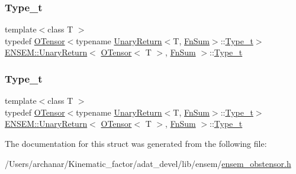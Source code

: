 \subsubsection{\texorpdfstring{Type\_t}{Type\_t}\hspace{0.1cm}{\footnotesize\ttfamily [1/2]}}
{\footnotesize\ttfamily template$<$class T $>$ \\
typedef \mbox{\hyperlink{classENSEM_1_1OTensor}{O\+Tensor}}$<$typename \mbox{\hyperlink{structENSEM_1_1UnaryReturn}{Unary\+Return}}$<$T, \mbox{\hyperlink{structENSEM_1_1FnSum}{Fn\+Sum}}$>$\+::\mbox{\hyperlink{structENSEM_1_1UnaryReturn_3_01OTensor_3_01T_01_4_00_01FnSum_01_4_a97a77020ae2f9a17419c0a6b9c45b5b9}{Type\+\_\+t}}$>$ \mbox{\hyperlink{structENSEM_1_1UnaryReturn}{E\+N\+S\+E\+M\+::\+Unary\+Return}}$<$ \mbox{\hyperlink{classENSEM_1_1OTensor}{O\+Tensor}}$<$ T $>$, \mbox{\hyperlink{structENSEM_1_1FnSum}{Fn\+Sum}} $>$\+::\mbox{\hyperlink{structENSEM_1_1UnaryReturn_3_01OTensor_3_01T_01_4_00_01FnSum_01_4_a97a77020ae2f9a17419c0a6b9c45b5b9}{Type\+\_\+t}}}

\mbox{\label{structENSEM_1_1UnaryReturn_3_01OTensor_3_01T_01_4_00_01FnSum_01_4_a97a77020ae2f9a17419c0a6b9c45b5b9}} 
\subsubsection{\texorpdfstring{Type\_t}{Type\_t}\hspace{0.1cm}{\footnotesize\ttfamily [2/2]}}
{\footnotesize\ttfamily template$<$class T $>$ \\
typedef \mbox{\hyperlink{classENSEM_1_1OTensor}{O\+Tensor}}$<$typename \mbox{\hyperlink{structENSEM_1_1UnaryReturn}{Unary\+Return}}$<$T, \mbox{\hyperlink{structENSEM_1_1FnSum}{Fn\+Sum}}$>$\+::\mbox{\hyperlink{structENSEM_1_1UnaryReturn_3_01OTensor_3_01T_01_4_00_01FnSum_01_4_a97a77020ae2f9a17419c0a6b9c45b5b9}{Type\+\_\+t}}$>$ \mbox{\hyperlink{structENSEM_1_1UnaryReturn}{E\+N\+S\+E\+M\+::\+Unary\+Return}}$<$ \mbox{\hyperlink{classENSEM_1_1OTensor}{O\+Tensor}}$<$ T $>$, \mbox{\hyperlink{structENSEM_1_1FnSum}{Fn\+Sum}} $>$\+::\mbox{\hyperlink{structENSEM_1_1UnaryReturn_3_01OTensor_3_01T_01_4_00_01FnSum_01_4_a97a77020ae2f9a17419c0a6b9c45b5b9}{Type\+\_\+t}}}



The documentation for this struct was generated from the following file\+:\begin{DoxyCompactItemize}
\item 
/\+Users/archanar/\+Kinematic\+\_\+factor/adat\+\_\+devel/lib/ensem/\mbox{\hyperlink{lib_2ensem_2ensem__obstensor_8h}{ensem\+\_\+obstensor.\+h}}\end{DoxyCompactItemize}
